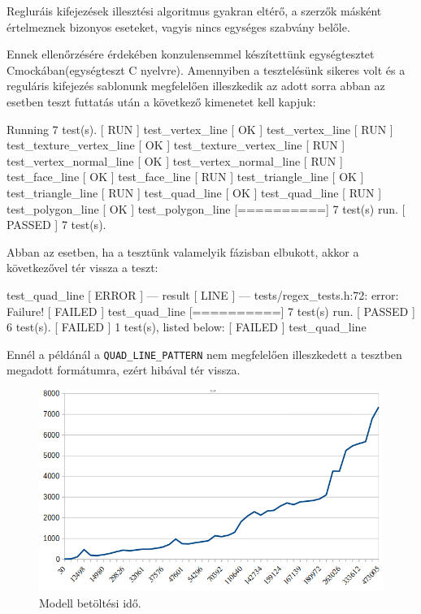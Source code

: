 

Regluráis kifejezések illesztési algoritmus gyakran eltérő, a szerzők másként értelmeznek bizonyos eseteket, vagyis nincs egységes szabvány belőle.

Ennek ellenőrzésére érdekében konzulensemmel készítettünk egységtesztet Cmockában(egységteszt C nyelvre). Amennyiben a tesztelésünk sikeres volt és a reguláris kifejezés sablonunk megfelelően illeszkedik az adott sorra abban az esetben teszt futtatás után a következő kimenetet kell kapjuk:
\bigskip
\begin{python}
[==========] Running 7 test(s).
[ RUN      ] test_vertex_line
[       OK ] test_vertex_line
[ RUN      ] test_texture_vertex_line
[       OK ] test_texture_vertex_line
[ RUN      ] test_vertex_normal_line
[       OK ] test_vertex_normal_line
[ RUN      ] test_face_line
[       OK ] test_face_line
[ RUN      ] test_triangle_line
[       OK ] test_triangle_line
[ RUN      ] test_quad_line
[       OK ] test_quad_line
[ RUN      ] test_polygon_line
[       OK ] test_polygon_line
[==========] 7 test(s) run.
[  PASSED  ] 7 test(s).
\end{python}
\newpage

\noindent Abban az esetben, ha a tesztünk valamelyik fázisban elbukott, akkor a következővel tér vissza a teszt:
\begin{python}
[ RUN      ] test_quad_line
[  ERROR   ] --- result
[   LINE   ] --- tests/regex_tests.h:72: error: Failure!
[  FAILED  ] test_quad_line
[==========] 7 test(s) run.
[  PASSED  ] 6 test(s).
[  FAILED  ] 1 test(s), listed below:
[  FAILED  ] test_quad_line
\end{python}
Ennél a példánál a \texttt{QUAD\_LINE\_PATTERN} nem megfelelően illeszkedett  a tesztben megadott formátumra, ezért hibával tér vissza.

\begin{figure}[h]
\centering
\includegraphics[width=\textwidth]{images/betoltesiido.png}
\caption{Modell betöltési idő.}
\label{fig:betolt}
\end{figure}

